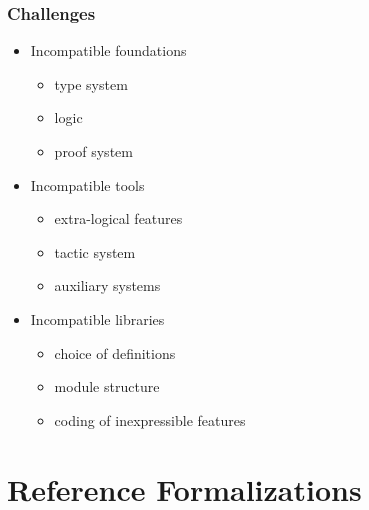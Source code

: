 \documentclass{beamer}
\begin{document}
\begin{frame}\frametitle{Challenges}
\begin{itemize}
\item Incompatible foundations
 \begin{itemize}
 \item type system
 \item logic
 \item proof system
 \end{itemize}
\item Incompatible tools
 \begin{itemize}
 \item extra-logical features
 \item tactic system
 \item auxiliary systems
 \end{itemize}
\item Incompatible libraries
 \begin{itemize}
 \item choice of definitions
 \item module structure
 \item coding of inexpressible features
 \end{itemize}
\end{itemize}
\end{frame}

\section{Reference Formalizations}
\end{document}
